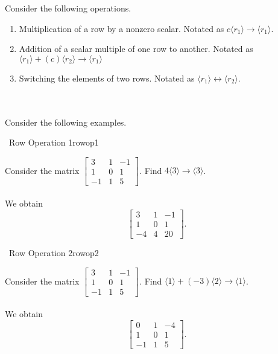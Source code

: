         Consider the following operations.
        \begin{enumerate}
            \item Multiplication of a row by a nonzero scalar. Notated as \(c\langle r_1\rangle\to\langle r_1\rangle\).
            \item Addition of a scalar multiple of one row to another. Notated as \(\langle r_1\rangle +(c)\langle r_2\rangle\to\langle r_1\rangle\)
            \item Switching the elements of two rows. Notated as \(\langle r_1 \rangle \leftrightarrow \langle r_2 \rangle\).
        \end{enumerate}
        \vphantom
        \\
        \\
        Consider the following examples.
        \begin{example}{\Difficulty\,\Difficulty\,\,Row Operation 1}{rowop1}
        
            Consider the matrix \(\begin{bmatrix} 3 & 1 & -1 \\ 1 & 0 & 1 \\ -1 & 1 & 5 \end{bmatrix}\). Find \(4\langle 3\rangle\to\langle 3\rangle\).
            \\
            \\
            We obtain
            \begin{equation*}
                \begin{bmatrix}
                    3 & 1 & -1 \\
                    1 & 0 & 1 \\
                    -4 & 4 & 20
                \end{bmatrix}.
            \end{equation*}
    
        \end{example}
        \pagebreak
        \begin{example}{\Difficulty\,\Difficulty\,\,Row Operation 2}{rowop2}
        
            Consider the matrix \(\begin{bmatrix} 3 & 1 & -1 \\ 1 & 0 & 1 \\ -1 & 1 & 5 \end{bmatrix}\). Find \(\langle 1\rangle +(-3)\langle 2\rangle\to\langle 1\rangle\).
            \\
            \\
            We obtain
            \begin{equation*}
                \begin{bmatrix}
                    0 & 1 & -4 \\
                    1 & 0 & 1 \\
                    -1 & 1 & 5
                \end{bmatrix}.
            \end{equation*}
        \end{example}
